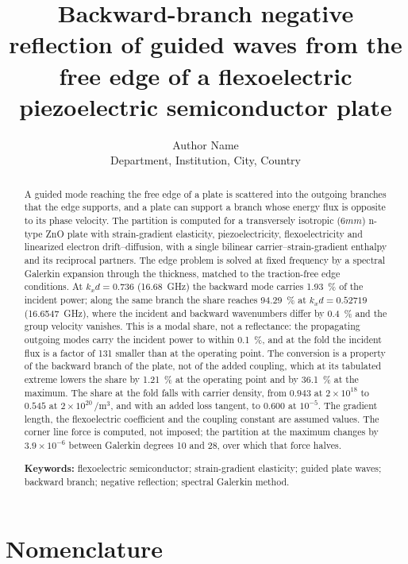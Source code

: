\documentclass[12pt,a4paper]{article}
\title{\bfseries Backward-branch negative reflection of guided waves from the
free edge of a flexoelectric piezoelectric semiconductor plate}
\author{Author Name\\[2pt]
\small Department, Institution, City, Country}
\date{}
\begin{document}
\maketitle

\begin{abstract}
\noindent
A guided mode reaching the free edge of a plate is scattered into the outgoing
branches that the edge supports, and a plate can support a branch whose energy flux is opposite to its phase velocity.  The partition is computed for a
transversely isotropic ($6mm$) n-type ZnO plate with strain-gradient
elasticity, piezoelectricity, flexoelectricity and linearized electron
drift--diffusion, with a single bilinear carrier--strain-gradient enthalpy and
its reciprocal partners.  The edge problem is solved at fixed frequency by a
spectral Galerkin expansion through the thickness, matched to the
traction-free edge conditions.  At $k_xd=0.736$ (\SI{16.68}{\giga\hertz}) the
backward mode carries \SI{1.93}{\percent} of the incident power; along the same
branch the share reaches \SI{94.29}{\percent} at $k_xd=0.52719$
(\SI{16.6547}{\giga\hertz}), where the incident and backward wavenumbers differ
by \SI{0.4}{\percent} and the group velocity vanishes.  This is a modal share, not a reflectance: the propagating outgoing modes carry the incident
power to within \SI{0.1}{\percent}, and at the fold the incident flux is a
factor of 131 smaller than at the operating point.  The conversion is a property of the
backward branch of the plate, not of the added coupling, which at its
tabulated extreme lowers the share by \SI{1.21}{\percent} at the operating
point and by \SI{36.1}{\percent} at the maximum.  The share at the fold falls with carrier density, from $0.943$ at $2\times10^{18}$ to $0.545$ at $2\times10^{20}\,\si{\per\cubic\metre}$, and with an added loss tangent, to $0.600$ at $10^{-5}$.  The gradient length, the flexoelectric coefficient and the
coupling constant are assumed values.  The corner line force is computed, not imposed; the partition at the maximum changes by $3.9\times10^{-6}$ between Galerkin degrees 10 and 28, over which that force halves.

\medskip
\noindent\textbf{Keywords:} flexoelectric semiconductor; strain-gradient
elasticity; guided plate waves; backward branch; negative reflection; spectral
Galerkin method.
\end{abstract}

\section*{Nomenclature}
\end{document}
